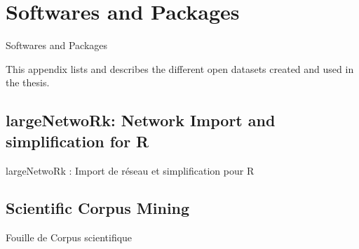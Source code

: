 
\newpage

\section{Softwares and Packages}{Softwares and Packages} %

\label{app:packages} %



\headercit{}{}{}



This appendix lists and describes the different open datasets created and used in the thesis.


\subsection{largeNetwoRk: Network Import and simplification for R}{largeNetwoRk : Import de réseau et simplification pour R}



\subsection{Scientific Corpus Mining}{Fouille de Corpus scientifique}
